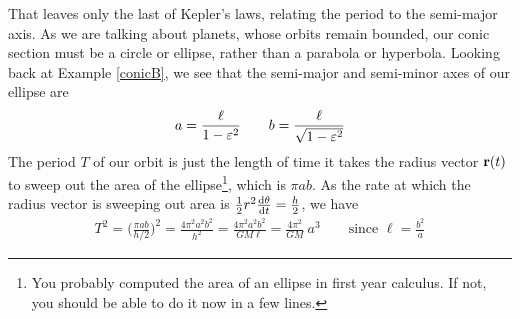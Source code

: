 That leaves only the last of Kepler's laws, relating the period 
to the semi-major axis. As we are talking about planets, whose orbits 
remain bounded, our conic section must be a circle or ellipse, rather 
than a parabola or hyperbola.
Looking back at Example \ref{conicB}, we see that the semi-major 
and semi-minor axes of our ellipse are
\begin{align*}
a=\frac{\ell}{1-\varepsilon^2}
\qquad
b=\frac{\ell}{\sqrt{1-\varepsilon^2}}
\end{align*}
The period $T$ of our orbit is just the length of time it takes
the radius vector $\mathbf{r}(t)$ to sweep out the area of the ellipse\footnote{You 
probably computed the area of an ellipse in first year calculus. If not,
you should be able to do it now in a few lines.},
which is $\pi ab$.  As the rate at which the radius vector is sweeping out 
area is $\frac{1}{2} r^2\diff{\theta}{t} = \frac{h}{2}$, we have
\begin{align*}
T^2 = \Big(\frac{\pi a b}{h/2}\Big)^2
    =\frac{4\pi^2 a^2 b^2}{h^2}
    =\frac{4\pi^2 a^2 b^2}{GM\ell}
    =\frac{4\pi^2}{GM}\ a^3\qquad
\text{since }\ell=\frac{b^2}{a}
\end{align*}




